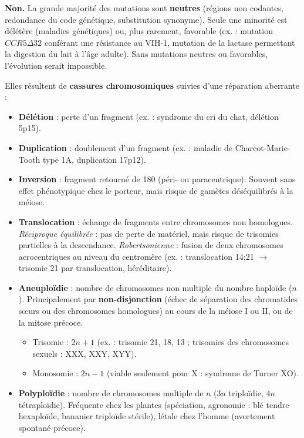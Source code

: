 \documentclass[11pt]{article}
\newcounter{popsec}
\newcounter{popsub}
\newcommand{\courssub}[1]{%
  \stepcounter{popsub}%
  \par\vspace{9pt}\noindent{\popxbold\fontsize{11.5}{13}\selectfont\color{popink}{\color{poporange}\thepopsec.\thepopsub}\hspace{6pt}#1}\par\nopagebreak\vspace{4pt}
}
\begin{document}
\begin{attention}[Piège : « mutation = maladie » ?]
\textbf{Non.} La grande majorité des mutations sont \textbf{neutres} (régions non codantes, redondance du code génétique, substitution synonyme). Seule une minorité est délétère (maladies génétiques) ou, plus rarement, favorable (ex. : mutation $CCR5\Delta32$ conférant une résistance au VIH-1, mutation de la lactase permettant la digestion du lait à l'âge adulte). Sans mutations neutres ou favorables, l'évolution serait impossible.
\end{attention}

\courssub{Mutations chromosomiques : le gros lot}

\begin{propriete}
Elles résultent de \textbf{cassures chromosomiques} suivies d'une réparation aberrante :
\begin{itemize}
    \item \textbf{Délétion} : perte d'un fragment (ex. : syndrome du cri du chat, délétion 5p15).
    \item \textbf{Duplication} : doublement d'un fragment (ex. : maladie de Charcot-Marie-Tooth type 1A, duplication 17p12).
    \item \textbf{Inversion} : fragment retourné de 180\textdegree{} (péri- ou paracentrique). Souvent sans effet phénotypique chez le porteur, mais risque de gamètes déséquilibrés à la méiose.
    \item \textbf{Translocation} : échange de fragments entre chromosomes non homologues. \emph{Réciproque équilibrée} : pas de perte de matériel, mais risque de trisomies partielles à la descendance. \emph{Robertsonienne} : fusion de deux chromosomes acrocentriques au niveau du centromère (ex. : translocation 14;21 $\to$ trisomie 21 par translocation, héréditaire).
\end{itemize}
\end{propriete}

\begin{propriete}
\begin{itemize}
    \item \textbf{Aneuploïdie} : nombre de chromosomes non multiple du nombre haploïde ($n$). Principalement par \textbf{non-disjonction} (échec de séparation des chromatides sœurs ou des chromosomes homologues) au cours de la méiose I ou II, ou de la mitose précoce.
    \begin{itemize}
        \item Trisomie : $2n+1$ (ex. : trisomie 21, 18, 13 ; trisomies des chromosomes sexuels : XXX, XXY, XYY).
        \item Monosomie : $2n-1$ (viable seulement pour X : syndrome de Turner XO).
    \end{itemize}
    \item \textbf{Polyploïdie} : nombre de chromosomes multiple de $n$ ($3n$ triploïdie, $4n$ tétraploïdie). Fréquente chez les plantes (spéciation, agronomie : blé tendre hexaploïde, bananier triploïde stérile), létale chez l'homme (avortement spontané précoce).
\end{itemize}
\end{propriete}
\end{document}
